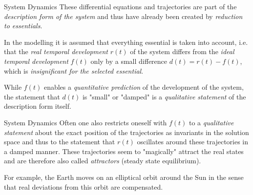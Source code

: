 \documentclass{beamer}
\begin{document}
\begin{frame}{System Dynamics}
These differential equations and trajectories are part of the
\emph{description form of the system} and thus have already been created by
\emph{reduction to essentials}.

In the modelling it is assumed that everything essential is taken into
account, i.e. that the \emph{real temporal development} $r(t)$ of the system
differs from the \emph{ideal temporal development} $f(t)$ only by a small
difference $d(t)=r(t)-f(t)$, which is \emph{insignificant for the selected
  essential}.

While $f(t)$ enables a \emph{quantitative prediction} of the development of
the system, the statement that $d(t)$ is "small" or "damped" is a
\emph{qualitative statement} of the description form itself.

\end{frame}

\begin{frame}{System Dynamics}
Often one also restricts oneself with $f(t)$ to a \emph{qualitative statement}
about the exact position of the trajectories as invariants in the solution
space and thus to the statement that $r(t)$ oscillates around these
trajectories in a damped manner.  These trajectories seem to "magically"
attract the real states and are therefore also called \emph{attractors}
(steady state equilibrium).

For example, the Earth moves on an elliptical orbit around the Sun in the
sense that real deviations from this orbit are compensated.

\end{frame}
\end{document}
